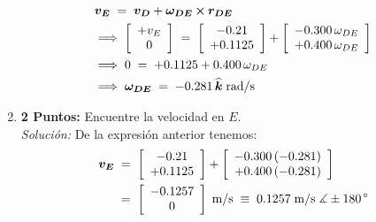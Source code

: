 \documentclass[ a4paper, twoside, 11pt]{article}
\begin{document}
\begin{problem}
\begin{enumerate}[label=\textbf{\alph*)}]
\begin{align*}
& {\boldsymbol{v_E}} \; = \; {\boldsymbol{v_D}} + {\boldsymbol{\omega_{DE}}} \,{\boldsymbol{\times}}\, {\boldsymbol{r_{DE}}} \\
& \Longrightarrow \; \left[ \begin{array}{c} +v_E \\ 0 \end{array} \right] \; = \; 
\left[ \begin{array}{c} -0.21 \\ +0.1125 \end{array} \right] +
\left[ \begin{array}{c}  -0.300 \, \omega_{DE} \\  +0.400 \, \omega_{DE} \end{array} \right] \\
& \Longrightarrow \;
0 \; = \; +0.1125 + 0.400 \, \omega_{DE} \\
& \Longrightarrow \;
{\boldsymbol{\omega_{DE}}} \; = \; -0.281 \, {\boldsymbol{\widehat{k}}} \; \text{rad/s}
\end{align*}
\item \textbf{2 Puntos:} Encuentre la velocidad en $E$. \\[1ex] \emph{Soluci\'on:} De la expresi\'on anterior tenemos: 
\begin{align*}
{\boldsymbol{v_E}} \;
& = \; \left[ \begin{array}{c} -0.21 \\ +0.1125 \end{array} \right] +
\left[ \begin{array}{c}  -0.300 \, (-0.281) \\  +0.400 \, (-0.281) \end{array} \right] \\
& = \; \left[ \begin{array}{c} -0.1257 \\ 0 \end{array} \right] \; \text{m/s} \; \equiv \;
0.1257 \; \text{m/s} \; \measuredangle \pm180^{\,\circ}
\end{align*}
\end{enumerate}
\QED

\end{problem}
\fullskip
\end{document}
